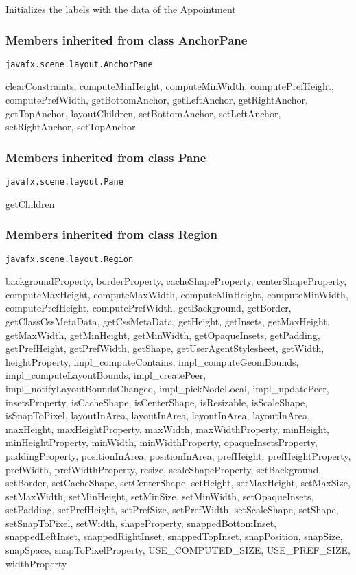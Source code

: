 {{{{{{{{{\begin{itemize}
{\begin{itemize}
{Initializes the labels with the data of the Appointment
}
\end{itemize}
}%
\end{itemize}
}
\subsubsection{Members inherited from class AnchorPane }{
\texttt{javafx.scene.layout.AnchorPane} {\small 
{}}
{\small 

clearConstraints, computeMinHeight, computeMinWidth, computePrefHeight, computePrefWidth, getBottomAnchor, getLeftAnchor, getRightAnchor, getTopAnchor, layoutChildren, setBottomAnchor, setLeftAnchor, setRightAnchor, setTopAnchor}
\subsubsection{Members inherited from class Pane }{
\texttt{javafx.scene.layout.Pane} {\small 
{}}
{\small 

getChildren}
\subsubsection{Members inherited from class Region }{
\texttt{javafx.scene.layout.Region} {\small 
{}}
{\small 

backgroundProperty, borderProperty, cacheShapeProperty, centerShapeProperty, computeMaxHeight, computeMaxWidth, computeMinHeight, computeMinWidth, computePrefHeight, computePrefWidth, getBackground, getBorder, getClassCssMetaData, getCssMetaData, getHeight, getInsets, getMaxHeight, getMaxWidth, getMinHeight, getMinWidth, getOpaqueInsets, getPadding, getPrefHeight, getPrefWidth, getShape, getUserAgentStylesheet, getWidth, heightProperty, impl\_computeContains, impl\_computeGeomBounds, impl\_computeLayoutBounds, impl\_createPeer, impl\_notifyLayoutBoundsChanged, impl\_pickNodeLocal, impl\_updatePeer, insetsProperty, isCacheShape, isCenterShape, isResizable, isScaleShape, isSnapToPixel, layoutInArea, layoutInArea, layoutInArea, layoutInArea, maxHeight, maxHeightProperty, maxWidth, maxWidthProperty, minHeight, minHeightProperty, minWidth, minWidthProperty, opaqueInsetsProperty, paddingProperty, positionInArea, positionInArea, prefHeight, prefHeightProperty, prefWidth, prefWidthProperty, resize, scaleShapeProperty, setBackground, setBorder, setCacheShape, setCenterShape, setHeight, setMaxHeight, setMaxSize, setMaxWidth, setMinHeight, setMinSize, setMinWidth, setOpaqueInsets, setPadding, setPrefHeight, setPrefSize, setPrefWidth, setScaleShape, setShape, setSnapToPixel, setWidth, shapeProperty, snappedBottomInset, snappedLeftInset, snappedRightInset, snappedTopInset, snapPosition, snapSize, snapSpace, snapToPixelProperty, USE\_COMPUTED\_SIZE, USE\_PREF\_SIZE, widthProperty}
}}}}}}}}}}}

